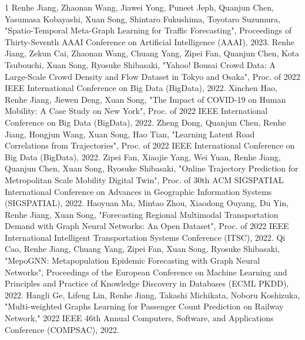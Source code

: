 \begin{査読付}{1}
Renhe Jiang, Zhaonan Wang, Jiawei Yong, Puneet Jeph, Quanjun Chen, Yasumasa Kobayashi,
Xuan Song, Shintaro Fukushima, Toyotaro Suzumura, "Spatio-Temporal Meta-Graph Learning for Traffic Forecasting", Proceedings of Thirty-Seventh AAAI Conference on Artificial Intelligence (AAAI), 2023.
Renhe Jiang, Zekun Cai, Zhaonan Wang, Chuang Yang, Zipei Fan, Quanjun Chen, Kota Tsubouchi, Xuan Song, Ryosuke Shibasaki, "Yahoo! Bousai Crowd Data: A Large-Scale Crowd Density and Flow Dataset in Tokyo and Osaka", Proc. of 2022 IEEE International Conference on Big Data (BigData), 2022.
Xinchen Hao, Renhe Jiang, Jiewen Deng, Xuan Song, "The Impact of COVID-19 on Human Mobility: A Case Study on New York", Proc. of 2022 IEEE International Conference on Big Data (BigData), 2022.
Zheng Dong, Quanjun Chen, Renhe Jiang, Hongjun Wang, Xuan Song, Hao Tian, "Learning Latent Road Correlations from Trajectories", Proc. of 2022 IEEE International Conference on Big Data (BigData), 2022.
Zipei Fan, Xiaojie Yang, Wei Yuan, Renhe Jiang, Quanjun Chen, Xuan Song, Ryosuke Shibasaki, "Online Trajectory Prediction for Metropolitan Scale Mobility Digital Twin", Proc. of 30th ACM SIGSPATIAL International Conference on Advances in Geographic Information Systems (SIGSPATIAL), 2022. 
Haoyuan Ma, Mintao Zhou, Xiaodong Ouyang, Du Yin, Renhe Jiang, Xuan Song, "Forecasting Regional Multimodal Transportation Demand with Graph Neural Networks: An Open Dataset", Proc. of 2022 IEEE International Intelligent Transportation Systems Conference (ITSC), 2022.
Qi Cao, Renhe Jiang, Chuang Yang, Zipei Fan, Xuan Song, Ryosuke Shibasaki, "MepoGNN: Metapopulation Epidemic Forecasting with Graph Neural Networks", Proceedings of the European Conference on Machine Learning and Principles and Practice of Knowledge Discovery in Databases (ECML PKDD), 2022. 
Hangli Ge, Lifeng Lin, Renhe Jiang, Takashi Michikata, Noboru Koshizuka, "Multi-weighted Graphs Learning for Passenger Count Prediction on Railway Network," 2022 IEEE 46th Annual Computers, Software, and Applications Conference (COMPSAC), 2022.



\end{査読付}
